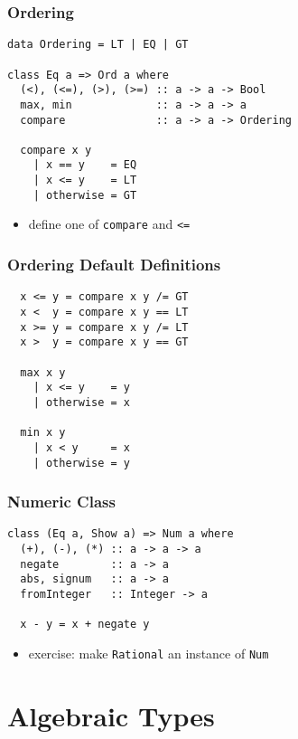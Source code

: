 \documentclass[dvipsnames]{beamer}
\theoremstyle{plain}
\begin{document}
\begin{frame}[fragile]
  \frametitle{Ordering}

  \begin{lstlisting}
data Ordering = LT | EQ | GT

class Eq a => Ord a where
  (<), (<=), (>), (>=) :: a -> a -> Bool
  max, min             :: a -> a -> a
  compare              :: a -> a -> Ordering

  compare x y
    | x == y    = EQ
    | x <= y    = LT
    | otherwise = GT
  \end{lstlisting}

  \begin{itemize}
    \item define one of \lstinline|compare| and \lstinline|<=|
  \end{itemize}
\end{frame}

\begin{frame}[fragile]
  \frametitle{Ordering Default Definitions}

  \begin{lstlisting}
  x <= y = compare x y /= GT
  x <  y = compare x y == LT
  x >= y = compare x y /= LT
  x >  y = compare x y == GT

  max x y
    | x <= y    = y
    | otherwise = x

  min x y
    | x < y     = x
    | otherwise = y
  \end{lstlisting}
\end{frame}

\begin{frame}[fragile]
  \frametitle{Numeric Class}

  \begin{lstlisting}
class (Eq a, Show a) => Num a where
  (+), (-), (*) :: a -> a -> a
  negate        :: a -> a
  abs, signum   :: a -> a
  fromInteger   :: Integer -> a

  x - y = x + negate y
  \end{lstlisting}

  \begin{itemize}
    \item exercise: make \lstinline|Rational| an instance of
      \lstinline|Num|
  \end{itemize}
\end{frame}

\section{Algebraic Types}
\end{document}
